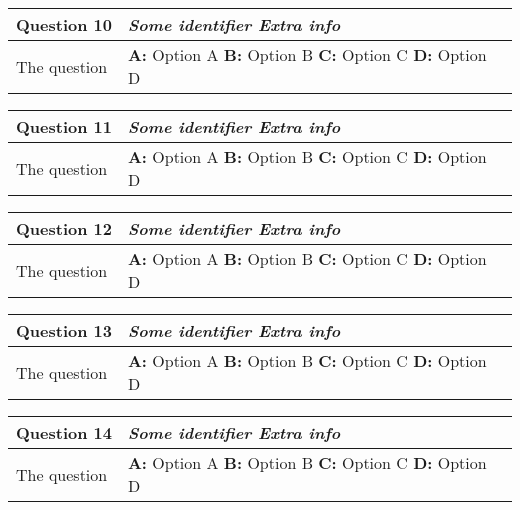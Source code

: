 \begin{tabular}{p{6cm}p{12.5cm}|} 
\textbf{Question 10} & \emph{Some identifier \hfill Extra info}  \\ \toprule  
The question & 
\textbf{A:} Option A \newline 
\textbf{B:} Option B \newline  
\textbf{C:} Option C \newline  
\textbf{D:} Option D \\ \bottomrule 
\end{tabular}


\begin{tabular}{p{6cm}p{12.5cm}|} 
\textbf{Question 11} & \emph{Some identifier \hfill Extra info}  \\ \toprule  
The question & 
\textbf{A:} Option A \newline 
\textbf{B:} Option B \newline  
\textbf{C:} Option C \newline  
\textbf{D:} Option D \\ \bottomrule 
\end{tabular}


\begin{tabular}{p{6cm}p{12.5cm}|} 
\textbf{Question 12} & \emph{Some identifier \hfill Extra info}  \\ \toprule  
The question & 
\textbf{A:} Option A \newline 
\textbf{B:} Option B \newline  
\textbf{C:} Option C \newline  
\textbf{D:} Option D \\ \bottomrule 
\end{tabular}


\begin{tabular}{p{6cm}p{12.5cm}|} 
\textbf{Question 13} & \emph{Some identifier \hfill Extra info}  \\ \toprule  
The question & 
\textbf{A:} Option A \newline 
\textbf{B:} Option B \newline  
\textbf{C:} Option C \newline  
\textbf{D:} Option D \\ \bottomrule 
\end{tabular}


\begin{tabular}{p{6cm}p{12.5cm}|} 
\textbf{Question 14} & \emph{Some identifier \hfill Extra info}  \\ \toprule  
The question & 
\textbf{A:} Option A \newline 
\textbf{B:} Option B \newline  
\textbf{C:} Option C \newline  
\textbf{D:} Option D \\ \bottomrule 
\end{tabular}


